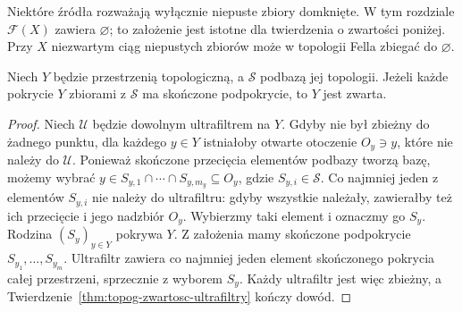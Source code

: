 \begin{uwaga}
\label{rem:topog21-fell-empty}
Niektóre źródła rozważają wyłącznie niepuste
zbiory domknięte. W tym rozdziale
\(\mathcal F(X)\) zawiera \(\varnothing\);
to założenie jest istotne dla
twierdzenia o zwartości poniżej.
Przy \(X\) niezwartym ciąg niepustych
zbiorów może w topologii Fella zbiegać
do \(\varnothing\).
\end{uwaga}

\begin{lemat}
\label{lem:topog21-alexander}
Niech \(Y\) będzie przestrzenią topologiczną,
a \(\mathcal S\) podbazą jej topologii.
Jeżeli każde pokrycie \(Y\) zbiorami z \(\mathcal S\)
ma skończone podpokrycie, to \(Y\) jest zwarta.
\end{lemat}
\begin{proof}
Niech \(\mathcal U\) będzie dowolnym ultrafiltrem na \(Y\).
Gdyby nie był zbieżny do żadnego punktu,
dla każdego \(y\in Y\) istniałoby otwarte
otoczenie \(O_y\ni y\), które nie należy do \(\mathcal U\).
Ponieważ skończone przecięcia elementów podbazy
tworzą bazę, możemy wybrać
\(y\in S_{y,1}\cap\cdots\cap S_{y,m_y}\subseteq O_y\),
gdzie \(S_{y,i}\in\mathcal S\).
Co najmniej jeden z elementów \(S_{y,i}\)
nie należy do ultrafiltru: gdyby wszystkie
należały, zawierałby też ich przecięcie
i jego nadzbiór \(O_y\).
Wybierzmy taki element i oznaczmy go \(S_y\).
Rodzina \((S_y)_{y\in Y}\) pokrywa \(Y\).
Z założenia mamy skończone podpokrycie
\(S_{y_1},\ldots,S_{y_m}\).
Ultrafiltr zawiera co najmniej jeden
element skończonego pokrycia całej przestrzeni,
sprzecznie z wyborem \(S_y\).
Każdy ultrafiltr jest więc zbieżny,
a Twierdzenie~\ref{thm:topog-zwartosc-ultrafiltry}
kończy dowód.
\end{proof}

